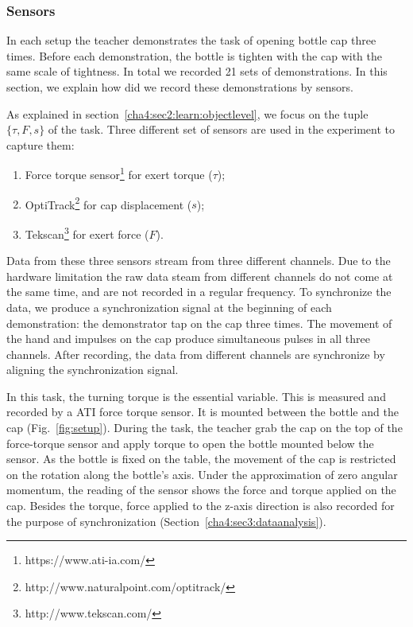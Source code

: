 \subsubsection{Sensors}
\label{cha4:sec3:sensor}
In each setup the teacher demonstrates the task of opening bottle cap three times. Before each demonstration, the bottle is tighten with the cap with the same scale of tightness. In total we recorded 21 sets of demonstrations. In this section, we explain how did we record these demonstrations by sensors.



As explained in section~\ref{cha4:sec2:learn:objectlevel}, we focus on the tuple $\{\tau,F,s\}$ of the task. Three different set of sensors are used in the experiment to capture them:

\begin{enumerate}
\item Force torque sensor\footnote{https://www.ati-ia.com/} for exert torque ($\tau$);
\item OptiTrack\footnote{http://www.naturalpoint.com/optitrack/} for cap displacement ($s$);
\item Tekscan\footnote{http://www.tekscan.com/} for exert force ($F$).
\end{enumerate}

Data from these three sensors stream from three different channels. Due to the hardware limitation the raw data steam from different channels do not come at the same time, and are not recorded in a regular frequency. To synchronize the data, we produce a synchronization signal at the beginning of each demonstration: the demonstrator tap on the cap three times. The movement of the hand and impulses on the cap produce simultaneous pulses in all three channels. After recording, the data from different channels are synchronize by aligning the synchronization signal.

In this task, the turning torque is the essential variable. This is measured and recorded by a ATI force torque sensor. It is mounted between the bottle and the cap (Fig.~\ref{fig:setup}). During the task, the teacher grab the cap on the top of the force-torque sensor and apply torque to open the bottle mounted below the sensor. As the bottle is fixed on the table, the movement of the cap is restricted on the rotation along the bottle's axis. Under the approximation of zero angular momentum, the reading of the sensor shows the force and torque applied on the cap. Besides the torque, force applied to the z-axis direction is also recorded for the purpose of synchronization (Section~\ref{cha4:sec3:dataanalysis}).

